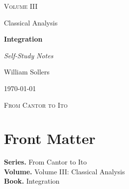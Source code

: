 \documentclass[12pt, a4paper]{report}
\begin{document}
\ExplSyntaxOff
\renewcommand{\familydefault}{\rmdefault}

\begin{titlepage}
\centering
\vspace*{3.5cm}

{\Large\scshape Volume III\par}
\vspace{0.35cm}
{\large Classical Analysis\par}

\vspace{1.4cm}

{\Huge\bfseries Integration\par}

\vspace{0.6cm}
{\large\itshape Self-Study Notes\par}

\vfill

{\large William Sollers\par}
\vspace{0.35cm}
{\large \today\par}

\vfill

{\large\scshape From Cantor to Ito\par}
\end{titlepage}

\clearpage
\thispagestyle{plain}
\chapter*{Front Matter}
\noindent\textbf{Series.} From Cantor to Ito\\[0.5em]
\textbf{Volume.} Volume III: Classical Analysis\\[0.5em]
\textbf{Book.} Integration

\clearpage
\tableofcontents
\clearpage
{}



\clearpage



\printindex[tech]
\printindex[dep]
\end{document}

